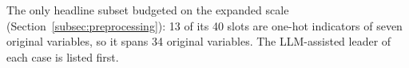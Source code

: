 \documentclass[final,5p,twocolumn]{elsarticle}
\providecommand{\DIFdeltex}[1]{{\protect\color{red} \scriptsize #1}} %
\providecommand{\DIFdelFL}[1]{\DIFdel{#1}} %
\providecommand{\DIFdel}[1]{\texorpdfstring{\DIFdeltex{#1}}{}} %
\begin{document}
\DIFdelFL{The only headline subset budgeted on the expanded scale (Section~\ref{subsec:preprocessing}): 13 of its 40 slots are one-hot indicators of seven original variables, so it spans 34 original variables. The LLM-assisted leader of each case is listed first.
}%
\end{document}
